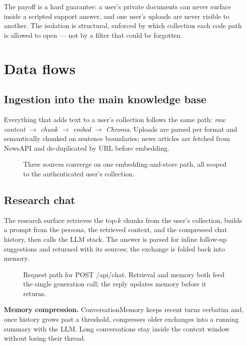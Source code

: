 \documentclass[11pt]{article}
\newcommand{\code}[1]{{\ttfamily\small #1}}
\begin{document}
\noindent The payoff is a hard guarantee: a user's private documents can never
surface inside a scripted support answer, and one user's uploads are never visible
to another. The isolation is structural, enforced by which collection each code
path is allowed to open --- not by a filter that could be forgotten.

\section{Data flows}
\label{sec:flows}

\subsection{Ingestion into the main knowledge base}
Everything that adds text to a user's collection follows the same path:
\emph{raw content $\rightarrow$ chunk $\rightarrow$ embed $\rightarrow$ Chroma}.
Uploads are parsed per format and semantically chunked on sentence boundaries; news
articles are fetched from NewsAPI and de-duplicated by URL before embedding.

\begin{figure}[H]
\centering

\caption{Three sources converge on one embedding-and-store path, all scoped to the
authenticated user's collection.}
\end{figure}

\subsection{Research chat}
The research surface retrieves the top-$k$ chunks from the user's collection, builds
a prompt from the persona, the retrieved context, and the compressed chat history,
then calls the LLM stack. The answer is parsed for inline follow-up suggestions and
returned with its sources; the exchange is folded back into memory.

\begin{figure}[H]
\centering

\caption{Request path for \code{POST /api/chat}. Retrieval and memory both feed the
single generation call; the reply updates memory before it returns.}
\end{figure}

\begin{note}
\textbf{Memory compression.} \code{ConversationMemory} keeps recent turns verbatim
and, once history grows past a threshold, compresses older exchanges into a running
summary with the LLM. Long conversations stay inside the context window without
losing their thread.
\end{note}
\end{document}
